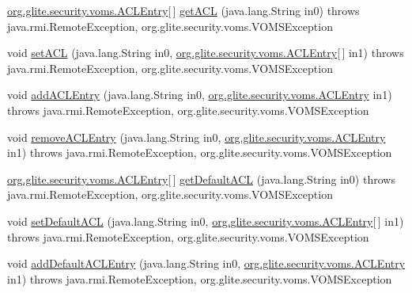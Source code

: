 \begin{DoxyCompactItemize}
\item 
\hyperlink{classorg_1_1glite_1_1security_1_1voms_1_1ACLEntry}{org.glite.security.voms.ACLEntry}\mbox{[}$\,$\mbox{]} \hyperlink{classorg_1_1glite_1_1security_1_1voms_1_1service_1_1admin_1_1VOMSAdminSoapBindingSkeleton_a39764b9c807e8f625c018aca96e0d556}{getACL} (java.lang.String in0)  throws java.rmi.RemoteException, org.glite.security.voms.VOMSException     
\item 
void \hyperlink{classorg_1_1glite_1_1security_1_1voms_1_1service_1_1admin_1_1VOMSAdminSoapBindingSkeleton_a744e9de07beb455d88ad243d24e36daf}{setACL} (java.lang.String in0, \hyperlink{classorg_1_1glite_1_1security_1_1voms_1_1ACLEntry}{org.glite.security.voms.ACLEntry}\mbox{[}$\,$\mbox{]} in1)  throws java.rmi.RemoteException, org.glite.security.voms.VOMSException     
\item 
void \hyperlink{classorg_1_1glite_1_1security_1_1voms_1_1service_1_1admin_1_1VOMSAdminSoapBindingSkeleton_a3a6257b03f2efac5e63ee88d3921220d}{addACLEntry} (java.lang.String in0, \hyperlink{classorg_1_1glite_1_1security_1_1voms_1_1ACLEntry}{org.glite.security.voms.ACLEntry} in1)  throws java.rmi.RemoteException, org.glite.security.voms.VOMSException     
\item 
void \hyperlink{classorg_1_1glite_1_1security_1_1voms_1_1service_1_1admin_1_1VOMSAdminSoapBindingSkeleton_a93a4952a90ae552ae5f45a4ea32a0ba0}{removeACLEntry} (java.lang.String in0, \hyperlink{classorg_1_1glite_1_1security_1_1voms_1_1ACLEntry}{org.glite.security.voms.ACLEntry} in1)  throws java.rmi.RemoteException, org.glite.security.voms.VOMSException     
\item 
\hyperlink{classorg_1_1glite_1_1security_1_1voms_1_1ACLEntry}{org.glite.security.voms.ACLEntry}\mbox{[}$\,$\mbox{]} \hyperlink{classorg_1_1glite_1_1security_1_1voms_1_1service_1_1admin_1_1VOMSAdminSoapBindingSkeleton_a427d7ea5c9293c0a2130dc88f2ad8590}{getDefaultACL} (java.lang.String in0)  throws java.rmi.RemoteException, org.glite.security.voms.VOMSException     
\item 
void \hyperlink{classorg_1_1glite_1_1security_1_1voms_1_1service_1_1admin_1_1VOMSAdminSoapBindingSkeleton_af54e7cba5c1e97d29664860b9510f731}{setDefaultACL} (java.lang.String in0, \hyperlink{classorg_1_1glite_1_1security_1_1voms_1_1ACLEntry}{org.glite.security.voms.ACLEntry}\mbox{[}$\,$\mbox{]} in1)  throws java.rmi.RemoteException, org.glite.security.voms.VOMSException     
\item 
void \hyperlink{classorg_1_1glite_1_1security_1_1voms_1_1service_1_1admin_1_1VOMSAdminSoapBindingSkeleton_a240dad07b323a7ae2bfd9b3358751bd3}{addDefaultACLEntry} (java.lang.String in0, \hyperlink{classorg_1_1glite_1_1security_1_1voms_1_1ACLEntry}{org.glite.security.voms.ACLEntry} in1)  throws java.rmi.RemoteException, org.glite.security.voms.VOMSException     

\end{DoxyCompactItemize}
